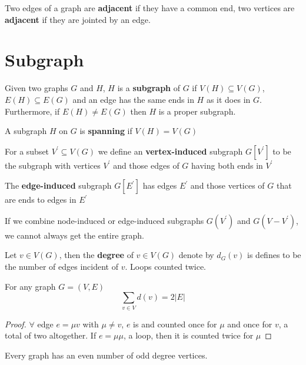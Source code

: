 		\begin{definition}[adjacent]
			Two edges of a graph are \textbf{adjacent} if they have a common end, two vertices are \textbf{adjacent} if they are jointed by an edge.
		\end{definition}

		\section{Subgraph}
			\begin{definition}[subgraph]
				Given two graphs $G$ and $H$, $H$ is a \textbf{subgraph} of $G$ if $V(H)\subseteq V(G)$, $E(H)\subseteq E(G)$ and an edge has the same ends in $H$ as it does in $G$. Furthermore, if $E(H)\neq E(G)$ then $H$ is a proper subgraph.
 			\end{definition}
			
			\begin{definition}[spanning]
				A subgraph $H$ on $G$ is \textbf{spanning} if $V(H) = V(G)$
			\end{definition}			

			For a subset $V^{'}\subseteq V(G)$ we define an \textbf{vertex-induced} subgraph $G[V^{'}]$ to be the subgraph with vertices $V^{'}$ and those edges of $G$ having both ends in $V^{'}$

			The \textbf{edge-induced} subgraph $G[E^{'}]$ has edges $E^{'}$ and those vertices of $G$ that are ends to edges in $E^{'}$

			If we combine node-induced or edge-induced subgraphs $G(V^{'})$ and $G(V - V^{'})$, we cannot always get the entire graph.

			Let $v\in V(G)$, then the \textbf{degree} of $v\in V(G)$ denote by $d_G(v)$ is defines to be the number of edges incident of $v$. Loops counted twice.

			\begin{theorem}
				For any graph $G=(V, E)$
				\begin{equation}
					\sum_{v\in V}d(v) = 2|E|
				\end{equation}			
			\end{theorem}

			\begin{proof}
				$\forall$ edge $e=\mu v$ with $\mu \neq v$, $e$ is  and counted once for $\mu$ and once for $v$, a total of two altogether. If $e=\mu \mu$, a loop, then it is counted twice for $\mu$			
			\end{proof}

			\begin{corollary}
				Every graph has an even number of odd degree vertices.
			\end{corollary}

